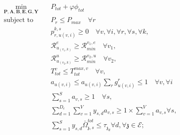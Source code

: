 \documentclass[conference]{IEEEtran}
\begin{document}
\begin{subequations}
\begin{alignat}{4}
\min\limits_{\boldsymbol{P}, \boldsymbol{A}, \boldsymbol{B}, \boldsymbol{E}, \boldsymbol{G}, \boldsymbol{Y} }   \quad &  P_{tot}+ \varphi \phi_{tot} \ \\
\text{subject to} \quad  &  P_r \leq P_{max} \quad \forall r
 \label{c11} \\
&p_{r,u(v,i)}^{k,s}  \geq 0  \quad \forall v,\forall i,\forall r,\forall s, \forall k,\label{c12} \\
&\mathcal{R}_{u_{(v_1,k)}}^e \geq  \mathcal{R}_{min}^{v_1,e} \quad \forall v_1, \label{c13} \\
&\mathcal{R}_{u_{(v_2,k)}}^u \geq  \mathcal{R}_{min}^{v_2,u} \quad \forall v_2, \label{c14} \\
&T_{tot}^v \leq T_{tot}^{max,v} \quad \forall v,\label{c15} \\
&a_{u(v,i)} \leq a_{u(v,i)}\sum_{r}g^r_{u(v,i)} \leq 1 \quad \forall v,\forall i  \\
& \textstyle  \sum_{s=1}^{S}a_{v,s} \geq 1 \quad \forall s, \label{c21} \\
& \textstyle  \sum_{d=1}^{D_c}\sum_{v=1}^{V}y_{s,d}a_{v,s} \geq 1\times\sum_{v=1}^{V}a_{v,s} \forall s,\label{c23} \\
 &\textstyle \sum_{s=1}^{S} y_{s,d} \bar{\Omega}_{\mathfrak{z},s}^{tot}  \leq   \tau_{\mathfrak{z}_d}  \forall d, \forall \mathfrak{z}\in \mathcal{E}; \label{c22}
\end{alignat}
\label{constraints}
\end{subequations}








\newpage
\newpage
\end{document}
